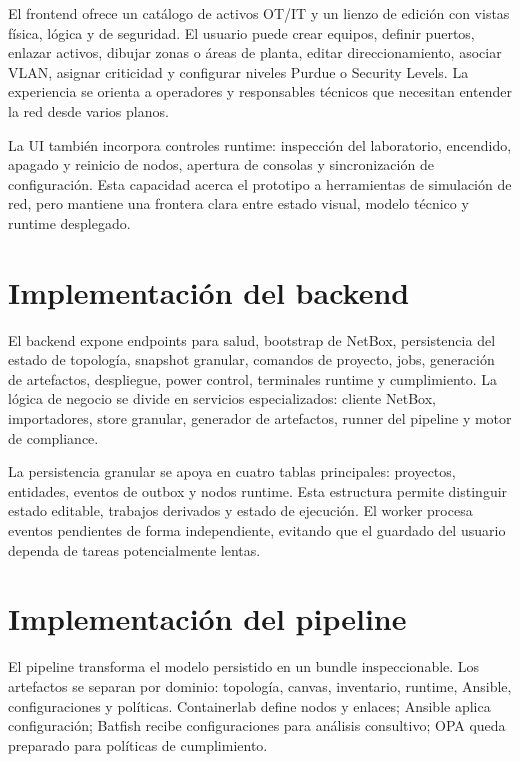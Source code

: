 El frontend ofrece un catálogo de activos OT/IT y un lienzo de edición con vistas física, lógica y de seguridad. El usuario puede crear equipos, definir puertos, enlazar activos, dibujar zonas o áreas de planta, editar direccionamiento, asociar VLAN, asignar criticidad y configurar niveles Purdue o Security Levels. La experiencia se orienta a operadores y responsables técnicos que necesitan entender la red desde varios planos.

La UI también incorpora controles runtime: inspección del laboratorio, encendido, apagado y reinicio de nodos, apertura de consolas y sincronización de configuración. Esta capacidad acerca el prototipo a herramientas de simulación de red, pero mantiene una frontera clara entre estado visual, modelo técnico y runtime desplegado.

\section{Implementación del backend} \label{sec:implementacion-backend}

El backend expone endpoints para salud, bootstrap de NetBox, persistencia del estado de topología, snapshot granular, comandos de proyecto, jobs, generación de artefactos, despliegue, power control, terminales runtime y cumplimiento. La lógica de negocio se divide en servicios especializados: cliente NetBox, importadores, store granular, generador de artefactos, runner del pipeline y motor de compliance.

La persistencia granular se apoya en cuatro tablas principales: proyectos, entidades, eventos de outbox y nodos runtime. Esta estructura permite distinguir estado editable, trabajos derivados y estado de ejecución. El worker procesa eventos pendientes de forma independiente, evitando que el guardado del usuario dependa de tareas potencialmente lentas.

\section{Implementación del pipeline} \label{sec:implementacion-pipeline}

El pipeline transforma el modelo persistido en un bundle inspeccionable. Los artefactos se separan por dominio: topología, canvas, inventario, runtime, Ansible, configuraciones y políticas. Containerlab define nodos y enlaces; Ansible aplica configuración; Batfish recibe configuraciones para análisis consultivo; OPA queda preparado para políticas de cumplimiento.

